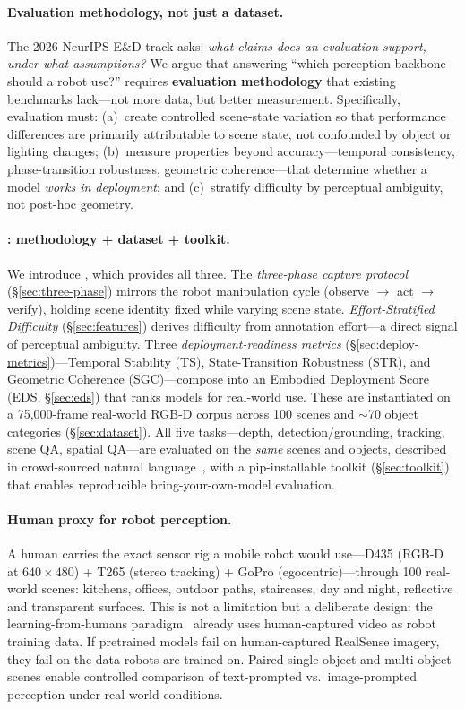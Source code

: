 \paragraph{Evaluation methodology, not just a dataset.}
The 2026 NeurIPS E\&D track asks: \textit{what claims does an evaluation support, under what assumptions?}
We argue that answering ``which perception backbone should a robot use?'' requires \textbf{evaluation methodology} that existing benchmarks lack---not more data, but better measurement.
Specifically, evaluation must:
(a)~create controlled scene-state variation so that performance differences are primarily attributable to scene state, not confounded by object or lighting changes;
(b)~measure properties beyond accuracy---temporal consistency, phase-transition robustness, geometric coherence---that determine whether a model \textit{works in deployment};
and (c)~stratify difficulty by perceptual ambiguity, not post-hoc geometry.

\paragraph{\coolname{}: methodology + dataset + toolkit.}
We introduce \coolname{}, which provides all three.
The \textit{three-phase capture protocol} (\S\ref{sec:three-phase}) mirrors the robot manipulation cycle (observe $\to$ act $\to$ verify), holding scene identity fixed while varying scene state.
\textit{Effort-Stratified Difficulty} (\S\ref{sec:features}) derives difficulty from annotation effort---a direct signal of perceptual ambiguity.
Three \textit{deployment-readiness metrics} (\S\ref{sec:deploy-metrics})---Temporal Stability (TS), State-Transition Robustness (STR), and Geometric Coherence (SGC)---compose into an Embodied Deployment Score (EDS, \S\ref{sec:eds}) that ranks models for real-world use.
These are instantiated on a 75{,}000-frame real-world RGB-D corpus across 100 scenes and ${\sim}$70 object categories (\S\ref{sec:dataset}).
All five tasks---depth, detection/grounding, tracking, scene QA, spatial QA---are evaluated on the \textit{same} scenes and objects, described in crowd-sourced natural language~\citep{padalunkal2023fewsol}, with a pip-installable toolkit (\S\ref{sec:toolkit}) that enables reproducible bring-your-own-model evaluation.

\paragraph{Human proxy for robot perception.}
A human carries the exact sensor rig a mobile robot would use---D435 (RGB-D at $640\!\times\!480$) + T265 (stereo tracking) + GoPro (egocentric)---through 100 real-world scenes: kitchens, offices, outdoor paths, staircases, day and night, reflective and transparent surfaces.
This is not a limitation but a deliberate design: the learning-from-humans paradigm~\citep{padalunkal2024iteach, 2025hrt1, khazatsky2024droid, kareer2024egomimic} already uses human-captured video as robot training data.
If pretrained models fail on human-captured RealSense imagery, they fail on the data robots are trained on.
Paired single-object and multi-object scenes enable controlled comparison of text-prompted vs.\ image-prompted perception under real-world conditions.

